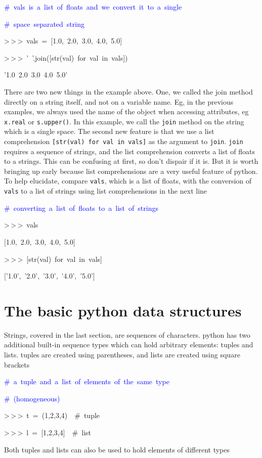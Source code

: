 \begin{lyxcode}
\textcolor{blue}{\#~vals~is~a~list~of~floats~and~we~convert~it~to~a~single}

\textcolor{blue}{\#~space~separated~string}

>\,{}>\,{}>~vals~=~{[}1.0,~2.0,~3.0,~4.0,~5.0]

>\,{}>\,{}>~'~'.join({[}str(val)~for~val~in~vals])

'1.0~2.0~3.0~4.0~5.0'
\end{lyxcode}
There are two new things in the example above. One, we called the
join method directly on a string itself, and not on a variable name.
Eg, in the previous examples, we always used the name of the object
when accessing attributes, eg \texttt{x.real} or \texttt{s.upper()}.
In this example, we call the \texttt{join} method on the string which
is a single space. The second new feature is that we use a list comprehension
\texttt{{[}str(val) for val in vals]} as the argument to \texttt{join}.
\texttt{join} requires a sequence of strings, and the list comprehension
converts a list of floats to a strings. This can be confusing at first,
so don't dispair if it is. But it is worth bringing up early because
list comprehensions are a very useful feature of python. To help elucidate,
compare \texttt{vals}, which is a list of floats, with the conversion
of \texttt{vals} to a list of strings using list comprehensions in
the next line

\begin{lyxcode}
\textcolor{blue}{\#~converting~a~list~of~floats~to~a~list~of~strings}

>\,{}>\,{}>~vals

{[}1.0,~2.0,~3.0,~4.0,~5.0]

>\,{}>\,{}>~{[}str(val)~for~val~in~vals]~

{[}'1.0',~'2.0',~'3.0',~'4.0',~'5.0']
\end{lyxcode}

\section[Data Structures]{The basic python data structures}

Strings, covered in the last section, are sequences of characters.
python has two additional built-in sequence types which can hold arbitrary
elements: tuples and lists. tuples are created using parentheses,
and lists are created using square brackets

\begin{lyxcode}
\textcolor{blue}{\#~a~tuple~and~a~list~of~elements~of~the~same~type}

\textcolor{blue}{\#~(homogeneous)}

>\,{}>\,{}>~t~=~(1,2,3,4)~~\#~tuple

>\,{}>\,{}>~l~=~{[}1,2,3,4]~~\#~list
\end{lyxcode}
Both tuples and lists can also be used to hold elements of different
types

